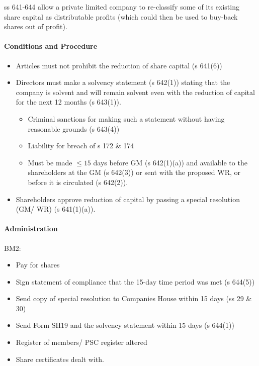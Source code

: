 \documentclass[
]{article}
\providecommand{\tightlist}{%
  \setlength{\itemsep}{0pt}\setlength{\parskip}{0pt}}
\begin{document}
ss 641-644 allow a private limited company to re-classify some of its
existing share capital as distributable profits (which could then be
used to buy-back shares out of profit).

\hypertarget{conditions-and-procedure}{%
\paragraph{Conditions and Procedure}\label{conditions-and-procedure}}

\begin{itemize}
\tightlist
\item
  Articles must not prohibit the reduction of share capital (s 641(6))
\item
  Directors must make a solvency statement (s 642(1)) stating that the
  company is solvent and will remain solvent even with the reduction of
  capital for the next 12 months (s 643(1)).

  \begin{itemize}
  \tightlist
  \item
    Criminal sanctions for making such a statement without having
    reasonable grounds (s 643(4))
  \item
    Liability for breach of s 172 \& 174
  \item
    Must be made \(\leq 15\) days before GM (s 642(1)(a)) and available
    to the shareholders at the GM (s 642(3)) or sent with the proposed
    WR, or before it is circulated (s 642(2)).
  \end{itemize}
\item
  Shareholders approve reduction of capital by passing a special
  resolution (GM/ WR) (s 641(1)(a)).
\end{itemize}

\hypertarget{administration-2}{%
\paragraph{Administration}\label{administration-2}}

BM2:

\begin{itemize}
\tightlist
\item
  Pay for shares
\item
  Sign statement of compliance that the 15-day time period was met (s
  644(5))
\item
  Send copy of special resolution to Companies House within 15 days (ss
  29 \& 30)
\item
  Send Form SH19 and the solvency statement within 15 days (s 644(1))
\item
  Register of members/ PSC register altered
\item
  Share certificates dealt with.
\end{itemize}
\end{document}
